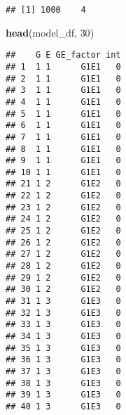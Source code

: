 \documentclass[]{article}
\newenvironment{Shaded}{\begin{snugshade}}{\end{snugshade}}
\newcommand{\CommentTok}[1]{\textcolor[rgb]{0.56,0.35,0.01}{\textit{#1}}}
\newcommand{\DataTypeTok}[1]{\textcolor[rgb]{0.13,0.29,0.53}{#1}}
\newcommand{\DecValTok}[1]{\textcolor[rgb]{0.00,0.00,0.81}{#1}}
\newcommand{\KeywordTok}[1]{\textcolor[rgb]{0.13,0.29,0.53}{\textbf{#1}}}
\newcommand{\NormalTok}[1]{#1}
\newcommand{\OperatorTok}[1]{\textcolor[rgb]{0.81,0.36,0.00}{\textbf{#1}}}
\newcommand{\StringTok}[1]{\textcolor[rgb]{0.31,0.60,0.02}{#1}}
\begin{document}
\begin{Shaded}
\end{Shaded}

\begin{verbatim}
## [1] 1000    4
\end{verbatim}

\begin{Shaded}
\begin{Highlighting}[]
    \KeywordTok{head}\NormalTok{(model_df, }\DecValTok{30}\NormalTok{)}
\end{Highlighting}
\end{Shaded}

\begin{verbatim}
##    G E GE_factor int
## 1  1 1      G1E1   0
## 2  1 1      G1E1   0
## 3  1 1      G1E1   0
## 4  1 1      G1E1   0
## 5  1 1      G1E1   0
## 6  1 1      G1E1   0
## 7  1 1      G1E1   0
## 8  1 1      G1E1   0
## 9  1 1      G1E1   0
## 10 1 1      G1E1   0
## 21 1 2      G1E2   0
## 22 1 2      G1E2   0
## 23 1 2      G1E2   0
## 24 1 2      G1E2   0
## 25 1 2      G1E2   0
## 26 1 2      G1E2   0
## 27 1 2      G1E2   0
## 28 1 2      G1E2   0
## 29 1 2      G1E2   0
## 30 1 2      G1E2   0
## 31 1 3      G1E3   0
## 32 1 3      G1E3   0
## 33 1 3      G1E3   0
## 34 1 3      G1E3   0
## 35 1 3      G1E3   0
## 36 1 3      G1E3   0
## 37 1 3      G1E3   0
## 38 1 3      G1E3   0
## 39 1 3      G1E3   0
## 40 1 3      G1E3   0
\end{verbatim}
\end{document}
